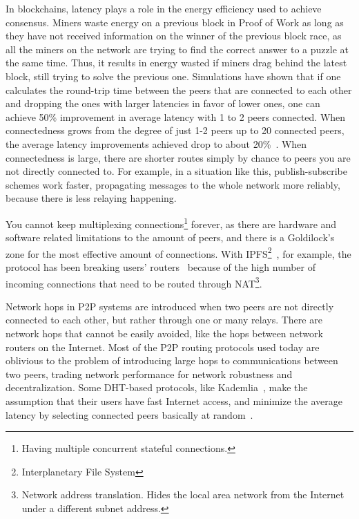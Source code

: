 In blockchains, latency plays a role in the energy efficiency used to achieve consensus. Miners waste energy on a previous block in Proof of Work as long as they have not received information on the winner of the previous block race, as all the miners on the network are trying to find the correct answer to a puzzle at the same time. Thus, it results in energy wasted if miners drag behind the latest block, still trying to solve the previous one. Simulations have shown that if one calculates the round-trip time between the peers that are connected to each other and dropping the ones with larger latencies in favor of lower ones, one can achieve 50\% improvement in average latency with 1 to 2 peers connected. When connectedness grows from the degree of just 1-2 peers up to 20 connected peers, the average latency improvements achieved drop to about 20\%~\cite{Bi_undated-is}. When connectedness is large, there are shorter routes simply by chance to peers you are not directly connected to. For example, in a situation like this, publish-subscribe schemes work faster, propagating messages to the whole network more reliably, because there is less relaying happening.

You cannot keep multiplexing connections\footnote{Having multiple concurrent stateful connections.} forever, as there are hardware and software related limitations to the amount of peers, and there is a Goldilock's zone for the most effective amount of connections. With IPFS\footnote{Interplanetary File System}~\cite{Labs_undated-uw}, for example, the protocol has been breaking users' routers~\cite{Whyrusleeping2016-ej} because of the high number of incoming connections that need to be routed through NAT\footnote{Network address translation. Hides the local area network from the Internet under a different subnet address.}.

Network hops in P2P systems are introduced when two peers are not directly connected to each other, but rather through one or many relays. There are network hops that cannot be easily avoided, like the hops between network routers on the Internet. Most of the P2P routing protocols used today are oblivious to the problem of introducing large hops to communications between two peers, trading network performance for network robustness and decentralization. Some DHT-based protocols, like Kademlia~\cite{Petar_Maymounkov2020-sx}, make the assumption that their users have fast Internet access, and minimize the average latency by selecting connected peers basically at random~\cite{Eigenmann2020-zm}.

